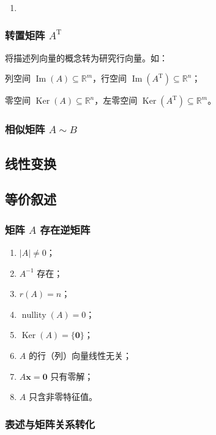 \documentclass[UTF8,fontset=fandol,zihao=5]{ctexart}
\newcommand{\R}{\mathbb{R}}
\newcommand{\Ker}{\operatorname{Ker}}
\newcommand{\Img}{\operatorname{Im}}
\newcommand{\nullity}{\operatorname{nullity}}
\begin{document}
\begin{enumerate}[label=（\arabic*）,start=9]
  \item
\end{enumerate}

\subsubsection{转置矩阵 $A^{\mathrm T}$}

将描述列向量的概念转为研究行向量。如：

列空间 $\Img(A)\subseteq\R^m$，行空间 $\Img(A^{\mathrm T})\subseteq\R^n$；

零空间 $\Ker(A)\subseteq\R^n$，左零空间 $\Ker(A^{\mathrm T})\subseteq\R^m$。

\subsubsection{相似矩阵 $A\sim B$}

\subsection{线性变换}

\subsubsection{}

\subsection{等价叙述}

\subsubsection{矩阵 $A$ 存在逆矩阵}

\begin{enumerate}[label=（\arabic*）]
  \item $|A|\ne0$；
  \item $A^{-1}$ 存在；
  \item $r(A)=n$；
  \item $\nullity(A)=0$；
  \item $\Ker(A)=\{\bm0\}$；
  \item $A$ 的行（列）向量线性无关；
  \item $A\bm x=\bm0$ 只有零解；
  \item $A$ 只含非零特征值。
\end{enumerate}

\subsubsection{表述与矩阵关系转化}
\end{document}
